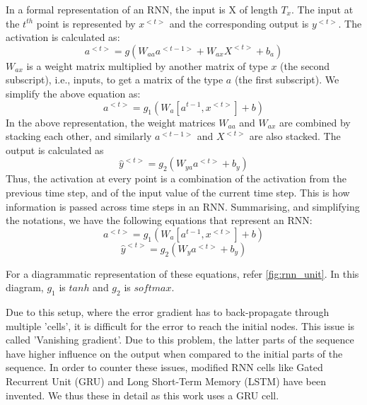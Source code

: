 In a formal representation of an RNN, the input is X of length \(T_x\). The input at the \(t^{th}\) point is represented by \(x^{<t>}\) and the corresponding output is \(y^{<t>}\). The activation is calculated as:\[a^{<t>}=g(W_{aa}a^{<t-1>}+W_{ax}X^{<t>}+b_a)\]
\(W_{ax}\) is a weight matrix multiplied by another matrix of type \(x\) (the second subscript), i.e., inputs, to get a matrix of the type \(a\) (the first subscript). We simplify the above equation as:
\[a^{<t>}=g_1(W_a[a^{t-1},x^{<t>}]+b)\]
In the above representation, the weight matrices \(W_{aa}\) and \(W_{ax}\) are combined by stacking each other, and similarly \(a^{<t-1>}\) and \(X^{<t>}\) are also stacked. The output is calculated as
\[\hat{y}^{<t>}=g_2(W_{ya}a^{<t>}+b_y)\]
Thus, the activation at every point is a combination of the activation from the previous time step, and of the input value of the current time step. This is how information is passed across time steps in an RNN.
Summarising, and simplifying the notations, we have the following equations that represent an RNN:
\[a^{<t>}=g_1(W_a[a^{t-1},x^{<t>}]+b)\]
\[\hat{y}^{<t>}=g_2(W_{y}a^{<t>}+b_y)\]

For a diagrammatic representation of these equations, refer \ref{fig:rnn_unit}. In this diagram, \(g_1\) is \(tanh\) and \(g_2\) is \(softmax\).




Due to this setup, where the error gradient has to back-propagate through multiple 'cells', it is difficult for the error to reach the initial nodes. This issue is called 'Vanishing gradient'. Due to this problem, the latter parts of the sequence have higher influence on the output when compared to the initial parts of the sequence. In order to counter these issues, modified RNN cells like Gated Recurrent Unit (GRU) and Long Short-Term Memory (LSTM) have been invented. We thus these in detail as this work uses a GRU cell.
